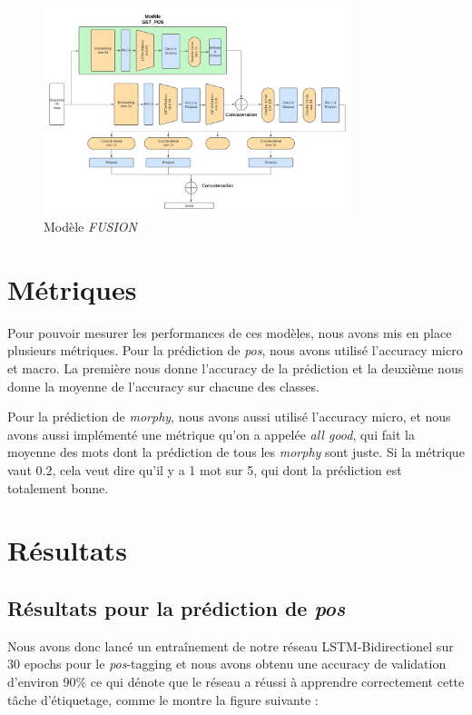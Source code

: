 \documentclass[a4paper]{article}
\begin{document}
\begin{figure}[!ht]
    \centering
    \includegraphics[width=0.8\textwidth]{get_morphy_fusion.png}
    \caption{Modèle \textit{FUSION}}
    \label{fig: model fusion}
\end{figure}


\section{Métriques}

Pour pouvoir mesurer les performances de ces modèles, nous avons mis en place plusieurs métriques. Pour la prédiction de 
\textit{pos}, nous avons utilisé l'accuracy micro et macro. La première nous donne l'accuracy de la prédiction et la deuxième
nous donne la moyenne de l'accuracy sur chacune des classes. 

Pour la prédiction de \textit{morphy}, nous avons aussi utilisé l'accuracy micro, et nous avons aussi implémenté une 
métrique qu'on a appelée \textit{all good}, qui fait la moyenne des mots dont la prédiction de tous les \textit{morphy}
sont juste. Si la métrique vaut $0.2$, cela veut dire qu'il y a 1 mot sur 5, qui dont la prédiction est totalement bonne.


\section{Résultats}

\subsection{Résultats pour la prédiction de \textit{pos}}
Nous avons donc lancé un entraînement de notre réseau LSTM-Bidirectionel sur 30 epochs pour le \textit{pos}-tagging et 
nous avons obtenu une accuracy de validation d'environ 90\% ce qui dénote que le réseau a réussi à apprendre 
correctement cette tâche d'étiquetage, comme le montre la figure suivante :
\end{document}
